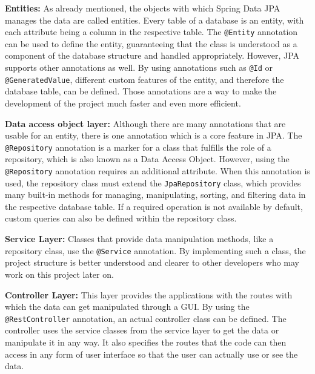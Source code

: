     \textbf{Entities:} \newline
    As already mentioned, the objects with which Spring Data JPA manages the data are called entities. Every table of a database is an entity, with each attribute being a column in the respective table. The \texttt{@Entity} annotation can be used to define the entity, guaranteeing that the class is understood as a component of the database structure and handled appropriately. However, JPA supports other annotations as well. By using annotations such as \texttt{@Id} or \texttt{@GeneratedValue}, different custom features of the entity, and therefore the database table, can be defined. Those annotations are a way to make the development of the project much faster and even more efficient. \Autocite{Andi:Entity1, Andi:Entity2, Andi:Entity3} \newline

    \textbf{Data access object layer:} \newline
    Although there are many annotations that are usable for an entity, there is one annotation which is a core feature in JPA. The \texttt{@Repository} annotation is a marker for a class that fulfills the role of a repository, which is also known as a Data Access Object. However, using the \texttt{@Repository} annotation requires an additional attribute.
    When this annotation is used, the repository class must extend the \texttt{JpaRepository} class, which provides many built-in methods for managing, manipulating, sorting, and filtering data in the respective database table. If a required operation is not available by default, custom queries can also be defined within the repository class. \Autocite{Andi:Repo} \newline 

    \textbf{Service Layer:} \newline
    Classes that provide data manipulation methods, like a repository class, use the \texttt{@Service} annotation. By implementing such a class, the project structure is better understood and clearer to other developers who may work on this project later on. \Autocite{Andi:ServiceLayer1,Andi:ServiceLayer2}  \newline 

    \textbf{Controller Layer:} \newline
    This layer provides the applications with the routes with which the data can get manipulated through a GUI. By using the \texttt{@RestController} annotation, an actual controller class can be defined. The controller uses the service classes from the service layer to get the data or manipulate it in any way. It also specifies the routes that the code can then
    access in any form of user interface so that the user can actually use or see the data.
    \Autocite{Andi:ControllerLayer} \newline

